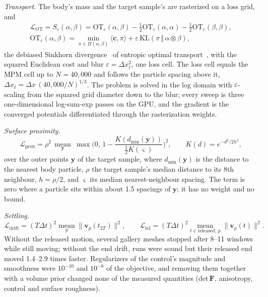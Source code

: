 \textit{Transport.} The body's mass and the target sample's are rasterized on a loss grid, and
\begin{equation}
\begin{gathered}
\mathcal{L}_{\mathrm{OT}}=S_\varepsilon(\alpha,\beta)=\mathrm{OT}_\varepsilon(\alpha,\beta)
 -\tfrac12\mathrm{OT}_\varepsilon(\alpha,\alpha)-\tfrac12\mathrm{OT}_\varepsilon(\beta,\beta),\\
\mathrm{OT}_\varepsilon(\alpha,\beta)=\min_{\pi\in\Pi(\alpha,\beta)}\langle\mathbf{c},\pi\rangle
 +\varepsilon\,\mathrm{KL}(\pi\,\Vert\,\alpha\otimes\beta),
\end{gathered}
\end{equation}
the debiased Sinkhorn divergence~\citep{feydy2019sinkhorn} of entropic optimal transport~\citep{cuturi2013sinkhorn}, with the squared Euclidean cost and blur
$\varepsilon=\Delta x_\ell^2$, one loss cell. The loss cell equals the MPM cell up to $N=40{,}000$ and follows the particle
spacing above it, $\Delta x_\ell=\Delta x\,(40{,}000/N)^{1/3}$. The problem is solved in the log domain with
$\varepsilon$-scaling from the squared grid diameter down to the blur; every sweep is three one-dimensional log-sum-exp
passes on the GPU, and the gradient is the converged potentials differentiated through the rasterization weights.

\textit{Surface proximity.}
\begin{equation}
\mathcal{L}_{\mathrm{prox}}=\rho^2\,\operatorname*{mean}_{\mathbf{y}}\;
 \max\!\Big(0,\,1-\frac{K(d_{\min}(\mathbf{y}))}{\tfrac12K(\varsigma)}\Big)^{2},
 \qquad K(d)=e^{-d^2/2h^2},
\end{equation}
over the outer points $\mathbf{y}$ of the target sample, where $d_{\min}(\mathbf{y})$ is the distance to the nearest body
particle, $\rho$ the target sample's median distance to its 8th neighbour, $h=\rho/2$, and $\varsigma$ its median
nearest-neighbour spacing. The term is zero where a particle sits within about 1.5 spacings of $\mathbf{y}$; it has no
weight and no bound.

\textit{Settling.}
\begin{equation}
\mathcal{L}_{\mathrm{drift}}=(T\Delta t)^2\operatorname*{mean}_p\lVert\mathbf{v}_p(t_{2T})\rVert^2 ,\qquad
\mathcal{L}_{\mathrm{rel}}=(T\Delta t)^2\operatorname*{mean}_{t\in\text{released},\,p}\lVert\mathbf{v}_p(t)\rVert^2 .
\end{equation}
Without the released motion, several gallery meshes stopped after 8--11 windows while still moving; without the end drift,
runs were sound but their released end moved 1.4--2.9 times faster. Regularizers of the control's magnitude and
smoothness were $10^{-10}$ and $10^{-8}$ of the objective, and removing them together with a volume prior changed none of
the measured quantities (det\,$\mathbf{F}$, anisotropy, control and surface roughness).

